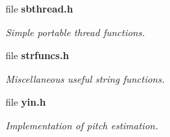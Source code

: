 \begin{DoxyCompactItemize}
file \textbf{ sbthread.\+h}
\begin{DoxyCompactList}\small\item\em Simple portable thread functions. \end{DoxyCompactList}\item 
file \textbf{ strfuncs.\+h}
\begin{DoxyCompactList}\small\item\em Miscellaneous useful string functions. \end{DoxyCompactList}\item 
file \textbf{ yin.\+h}
\begin{DoxyCompactList}\small\item\em Implementation of pitch estimation. \end{DoxyCompactList}\end{DoxyCompactItemize}
